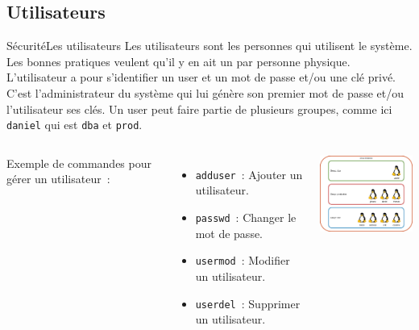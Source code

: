 \documentclass{beamer}
\begin{document}
    \subsection{Utilisateurs}\label{subsec:utilisateurs}
    \begin{frame}{Sécurité}{Les utilisateurs}
        Les utilisateurs sont les personnes qui utilisent le système.
        Les bonnes pratiques veulent qu'il y en ait un par personne physique.
        L'utilisateur a pour s'identifier un user et un mot de passe et/ou une clé privé.
        C'est l'administrateur du système qui lui génère son premier mot de passe et/ou l'utilisateur ses clés.
        Un user peut faire partie de plusieurs groupes, comme ici \lstinline{daniel} qui est \lstinline{dba} et \lstinline{prod}.
        \begin{columns}
            Exemple de commandes pour gérer un utilisateur~:
            \begin{itemize}
                \item \lstinline{adduser}~: Ajouter un utilisateur.
                \item \lstinline{passwd}~: Changer le mot de passe.
                \item \lstinline{usermod}~: Modifier un utilisateur.
                \item \lstinline{userdel}~: Supprimer un utilisateur.
            \end{itemize}
            \centering
            \includegraphics[width=5cm]{image/groups-and-users.drawio}
        \end{columns}
    \end{frame}
\end{document}
